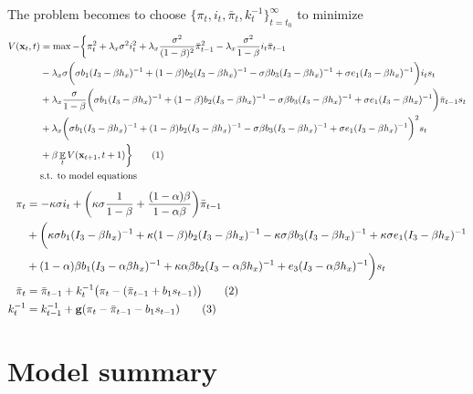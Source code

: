 \documentclass[11pt]{article}
\renewcommand{\[}{\begin{equation}}
\renewcommand{\]}{\end{equation}}
\DeclareMathOperator{\E}{\mathbb{E}}
\newcommand\numberthis{\addtocounter{equation}{1}\tag{\theequation}} %
\begin{document}
The problem becomes to choose $\{\pi_t, i_t, \bar{\pi}_t, k_t^{-1}\}_{t=t_0}^{\infty}$ to minimize
\begin{align*}
V(\mathbf{x}_t,t)& = \max -\bigg\{ \pi_t^2 +  \lambda_x\sigma^2 i_t^2 +\lambda_x\frac{\sigma^2}{(1-\beta)^2}\bar{\pi}_{t-1}^2 -\lambda_x\frac{\sigma^2}{1-\beta}i_t \bar{\pi}_{t-1} \\
&-\lambda_x\sigma\bigg(\sigma b_1(I_3 - \beta h_x)^{-1}  +  (1-\beta)b_2 (I_3 - \beta h_x)^{-1} - \sigma\beta b_3 (I_3 - \beta h_x)^{-1} +\sigma e_1(I_3 - \beta h_x)^{-1}\bigg)i_ts_t\\
& + \lambda_x \frac{\sigma}{1-\beta}\bigg(\sigma b_1(I_3 - \beta h_x)^{-1}  +  (1-\beta)b_2 (I_3 - \beta h_x)^{-1} - \sigma\beta b_3 (I_3 - \beta h_x)^{-1} +\sigma e_1(I_3 - \beta h_x)^{-1}\bigg)\bar{\pi}_{t-1}s_t\\
& +\lambda_x\bigg(\sigma b_1(I_3 - \beta h_x)^{-1}  +  (1-\beta)b_2 (I_3 - \beta h_x)^{-1} - \sigma\beta b_3 (I_3 - \beta h_x)^{-1} +\sigma e_1(I_3 - \beta h_x)^{-1}\bigg)^2s_t \\
& + \beta \E_t V(\mathbf{x}_{t+1},t+1) \bigg\} \numberthis \\
& \text{s.t. to model equations}
\end{align*}
 \begin{align*}
 \pi_t & = -\kappa\sigma i_t +\bigg(\kappa\sigma \frac{1}{1-\beta} +  \frac{(1-\alpha)\beta}{1-\alpha\beta}\bigg)\bar{\pi}_{t-1}  \\
 & +\bigg(\kappa\sigma b_1(I_3 - \beta h_x)^{-1}   +  \kappa(1-\beta)b_2 (I_3 - \beta h_x)^{-1} - \kappa\sigma\beta b_3 (I_3 - \beta h_x)^{-1}+\kappa\sigma e_1(I_3 - \beta h_x)^{-1}   \\
 &  + (1-\alpha)\beta b_1(I_3 - \alpha\beta h_x)^{-1}  +\kappa\alpha\beta b_2 (I_3 - \alpha\beta h_x)^{-1} +e_3(I_3 - \alpha\beta h_x)^{-1}\bigg)s_t \\
 \bar{\pi}_{t} & = \bar{\pi}_{t-1} + k_t^{-1}\big(\pi_{t} -(\bar{\pi}_{t-1}+b_1 s_{t-1}) \big)   \numberthis  \\
 k_t^{-1} & = k_{t-1}^{-1}+ \mathbf{g}(\pi_t - \bar{\pi}_{t-1}-b_1 s_{t-1})  \numberthis
\end{align*}






\newpage
\appendix
\section{Model summary}
\end{document}
